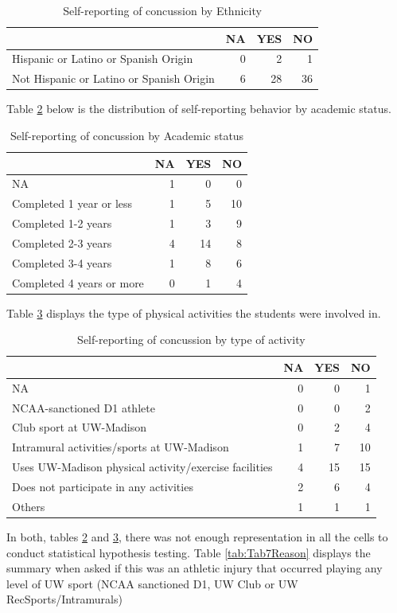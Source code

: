 \documentclass[11]{article}
\begin{document}
\begin{table}[H]
\centering
\begin{tabular}{lrrr}
  \hline
 & NA & YES & NO \\ 
  \hline
Hispanic or Latino or Spanish Origin &   0 &   2 &   1 \\ 
  Not Hispanic or Latino or Spanish Origin &   6 &  28 &  36 \\ 
   \hline
\end{tabular}
\caption{Self-reporting of concussion by Ethnicity} 
\label{tab:Tab4Eth}
\end{table}Table \ref{tab:Tab5Acad} below is the distribution of self-reporting behavior by academic status.
\begin{table}[H]
\centering
\begin{tabular}{lrrr}
  \hline
 & NA & YES & NO \\ 
  \hline
NA &   1 &   0 &   0 \\ 
  Completed 1 year or less &   1 &   5 &  10 \\ 
  Completed 1-2 years &   1 &   3 &   9 \\ 
  Completed 2-3 years &   4 &  14 &   8 \\ 
  Completed 3-4 years &   1 &   8 &   6 \\ 
  Completed 4 years or more &   0 &   1 &   4 \\ 
   \hline
\end{tabular}
\caption{Self-reporting of concussion by Academic status} 
\label{tab:Tab5Acad}
\end{table}Table \ref{tab:Tab6Desc} displays the type of physical activities the students were involved in. 
\begin{table}[H]
\centering
\begin{tabular}{lrrr}
  \hline
 & NA & YES & NO \\ 
  \hline
NA &   0 &   0 &   1 \\ 
  NCAA-sanctioned D1 athlete &   0 &   0 &   2 \\ 
  Club sport at UW-Madison &   0 &   2 &   4 \\ 
  Intramural activities/sports at UW-Madison &   1 &   7 &  10 \\ 
  Uses UW-Madison physical activity/exercise facilities &   4 &  15 &  15 \\ 
  Does not participate in any activities &   2 &   6 &   4 \\ 
  Others &   1 &   1 &   1 \\ 
   \hline
\end{tabular}
\caption{Self-reporting of concussion by type of activity} 
\label{tab:Tab6Desc}
\end{table}In both, tables \ref{tab:Tab5Acad} and  \ref{tab:Tab6Desc}, there was not enough representation in all the cells to conduct statistical hypothesis testing. Table \ref{tab:Tab7Reason} displays the summary when asked if this was an athletic injury that occurred playing any level of UW sport (NCAA sanctioned D1, UW Club or UW RecSports/Intramurals) \\
\end{document}
